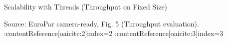 \begin{frame}{Scalability with Threads (Throughput on Fixed Size)}
\small
% 



\vspace{1mm}
{\scriptsize Source: EuroPar camera-ready, Fig. 5 (Throughput evaluation).  :contentReference[oaicite:2]{index=2}  :contentReference[oaicite:3]{index=3} }
\end{frame}
